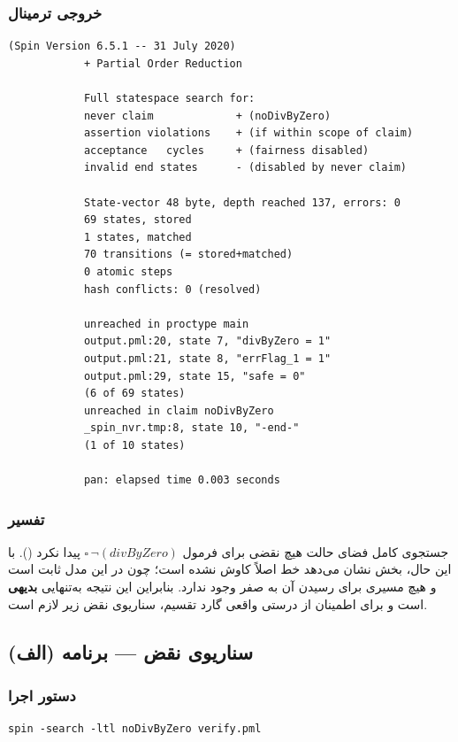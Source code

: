 \documentclass[12pt]{report}
\begin{document}
	\subsubsection{خروجی ترمینال}
	\begin{latin}
		\begin{lstlisting}[style=termstyle]
			(Spin Version 6.5.1 -- 31 July 2020)
			+ Partial Order Reduction
			
			Full statespace search for:
			never claim             + (noDivByZero)
			assertion violations    + (if within scope of claim)
			acceptance   cycles     + (fairness disabled)
			invalid end states      - (disabled by never claim)
			
			State-vector 48 byte, depth reached 137, errors: 0
			69 states, stored
			1 states, matched
			70 transitions (= stored+matched)
			0 atomic steps
			hash conflicts: 0 (resolved)
			
			unreached in proctype main
			output.pml:20, state 7, "divByZero = 1"
			output.pml:21, state 8, "errFlag_1 = 1"
			output.pml:29, state 15, "safe = 0"
			(6 of 69 states)
			unreached in claim noDivByZero
			_spin_nvr.tmp:8, state 10, "-end-"
			(1 of 10 states)
			
			pan: elapsed time 0.003 seconds
		\end{lstlisting}
	\end{latin}
	
	\subsubsection{تفسیر}
	جستجوی کامل فضای حالت هیچ نقضی برای فرمول $\square\,\lnot(\mathit{divByZero})$ پیدا نکرد (). با این حال، بخش  نشان می‌دهد خط  اصلاً کاوش نشده است؛ چون در این مدل  ثابت است و هیچ مسیری برای رسیدن آن به صفر وجود ندارد. بنابراین این نتیجه به‌تنهایی \textbf{بدیهی} است و برای اطمینان از درستی واقعی گارد تقسیم، سناریوی نقض زیر لازم است.
	
	\subsection{سناریوی نقض --- برنامه (الف)}
	
	\subsubsection{دستور اجرا}
	\begin{latin}
		\begin{lstlisting}[style=codestyle]
			spin -search -ltl noDivByZero verify.pml
		\end{lstlisting}
	\end{latin}
	
\end{document}
